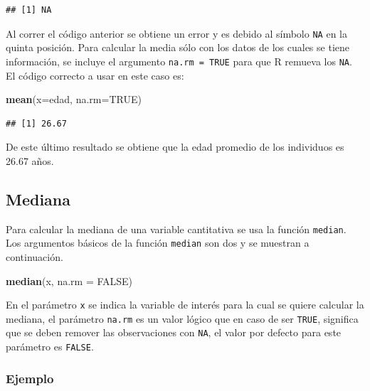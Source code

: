 \documentclass[10pt,]{krantz}
\makeatletter
\newenvironment{Shaded}{\begin{snugshade}}{\end{snugshade}}
\newcommand{\KeywordTok}[1]{\textcolor[rgb]{0.13,0.29,0.53}{\textbf{#1}}}
\newcommand{\DataTypeTok}[1]{\textcolor[rgb]{0.13,0.29,0.53}{#1}}
\newcommand{\OtherTok}[1]{\textcolor[rgb]{0.56,0.35,0.01}{#1}}
\newcommand{\NormalTok}[1]{#1}
\newenvironment{kframe}{%
\medskip{}
\setlength{\fboxsep}{.8em}
 \def\at@end@of@kframe{}%
 \ifinner\ifhmode%
  \def\at@end@of@kframe{\end{minipage}}%
  \begin{minipage}{\columnwidth}%
 \fi\fi%
 \def\FrameCommand##1{\hskip\@totalleftmargin \hskip-\fboxsep
 \colorbox{shadecolor}{##1}\hskip-\fboxsep
     \hskip-\linewidth \hskip-\@totalleftmargin \hskip\columnwidth}%
 \MakeFramed {\advance\hsize-\width
   \@totalleftmargin\z@ \linewidth\hsize
   \@setminipage}}%
 {\par\unskip\endMakeFramed%
 \at@end@of@kframe}
\renewenvironment{Shaded}{\begin{kframe}}{\end{kframe}}
\makeatother
\begin{document}
\begin{verbatim}
## [1] NA
\end{verbatim}

Al correr el código anterior se obtiene un error y es debido al símbolo
\texttt{NA} en la quinta posición. Para calcular la media sólo con los
datos de los cuales se tiene información, se incluye el argumento
\texttt{na.rm\ =\ TRUE} para que R remueva los \texttt{NA}. El código
correcto a usar en este caso es:

\begin{Shaded}
\begin{Highlighting}[]
\KeywordTok{mean}\NormalTok{(}\DataTypeTok{x=}\NormalTok{edad, }\DataTypeTok{na.rm=}\OtherTok{TRUE}\NormalTok{)}
\end{Highlighting}
\end{Shaded}

\begin{verbatim}
## [1] 26.67
\end{verbatim}

De este último resultado se obtiene que la edad promedio de los
individuos es 26.67 años.

\subsection{\texorpdfstring{Mediana 
}{Mediana  }}\label{mediana}

Para calcular la mediana de una variable cantitativa se usa la función
\texttt{median}. Los argumentos básicos de la función \texttt{median}
son dos y se muestran a continuación.

\begin{Shaded}
\begin{Highlighting}[]
\KeywordTok{median}\NormalTok{(x, }\DataTypeTok{na.rm =} \OtherTok{FALSE}\NormalTok{)}
\end{Highlighting}
\end{Shaded}

En el parámetro \texttt{x} se indica la variable de interés para la cual
se quiere calcular la mediana, el parámetro \texttt{na.rm} es un valor
lógico que en caso de ser \texttt{TRUE}, significa que se deben remover
las observaciones con \texttt{NA}, el valor por defecto para este
parámetro es \texttt{FALSE}.

\subsubsection*{Ejemplo}\label{ejemplo-18}
\end{document}
